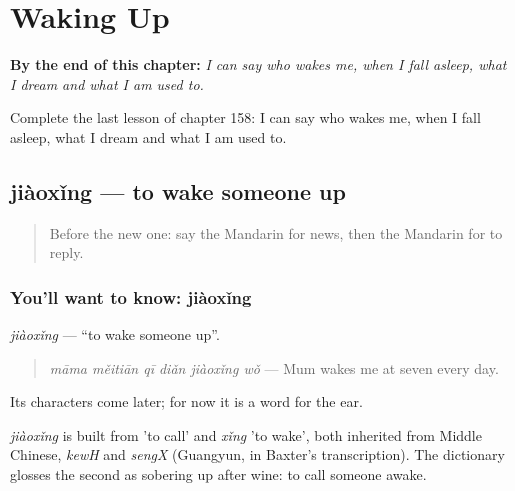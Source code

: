 
\chapter{Waking Up}
\label{ch:zh-waking-up}

\begin{chapteropening}
\textbf{By the end of this chapter:} \emph{I can say who wakes me, when I fall asleep, what I dream and what I am used to.}

Complete the last lesson of chapter 158: I can say who wakes me, when I fall asleep, what I dream and what I am used to.
\end{chapteropening}

\section[jiàoxǐng]{jiàoxǐng — to wake someone up}

\label{lesson:ZH-C158-jiaoxing}



\begin{quote}
Before the new one: say the Mandarin for news, then the Mandarin for to reply.
\end{quote}

\subsection*{You'll want to know: jiàoxǐng}
\emph{jiàoxǐng} — \textquotedblleft{}to wake someone up\textquotedblright{}.

\begin{quote}
\emph{māma měitiān qī diǎn jiàoxǐng wǒ} — Mum wakes me at seven every day.
\end{quote}

Its characters come later; for now it is a word for the ear.

\begin{cousinweb}
\emph{jiàoxǐng} is built from  'to call' and \emph{xǐng} 'to wake', both inherited from Middle Chinese, \emph{kewH} and \emph{sengX} (Guangyun, in Baxter's transcription). The dictionary glosses the second as sobering up after wine: to call someone awake.
\end{cousinweb}

